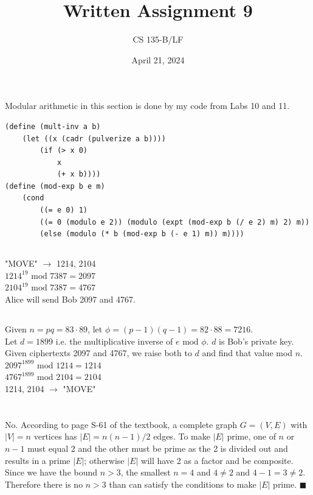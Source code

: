 \documentclass{article}
\title{Written Assignment 9}
\author{CS 135-B/LF}
\date{April 21, 2024}
\renewcommand{\mod}{\text{ mod }}
\begin{document}
\maketitle
\raggedright


\section{}
Modular arithmetic in this section is done by my code from Labs 10 and 11.\\
\begin{verbatim}
(define (mult-inv a b)
    (let ((x (cadr (pulverize a b))))
        (if (> x 0)
            x
            (+ x b))))
(define (mod-exp b e m)
    (cond
        ((= e 0) 1)
        ((= 0 (modulo e 2)) (modulo (expt (mod-exp b (/ e 2) m) 2) m))
        (else (modulo (* b (mod-exp b (- e 1) m)) m))))
\end{verbatim}
\subsection{}
"MOVE" $\rightarrow$ 1214, 2104\\
$1214^{19} \mod 7387 = 2097$\\
$2104^{19} \mod 7387 = 4767$\\
Alice will send Bob 2097 and 4767.

\subsection{}
Given $n = pq = 83\cdot89$, let $\phi = (p-1)(q-1) = 82\cdot88 = 7216$.\\
Let $d = 1899$ i.e. the multiplicative inverse of $e \mod \phi$. $d$ is Bob's private key. Given ciphertexts 2097 and 4767, we raise both to $d$ and find that value mod $n$.\\
$2097^{1899} \mod 1214 = 1214$\\
$4767^{1899} \mod 2104 = 2104$\\
1214, 2104 $\rightarrow$ "MOVE"


\section{}
No. According to page S-61 of the textbook, a complete graph $G = (V,E)$ with $|V| = n$ vertices has $|E| = n(n-1)/2$ edges. To make $|E|$ prime, one of $n$ or $n-1$ must equal 2 and the other must be prime as the 2 is divided out and results in a prime $|E|$; otherwise $|E|$ will have 2 as a factor and be composite. Since we have the bound $n>3$, the smallest $n = 4$ and $4 \neq 2$ and $4-1 = 3 \neq 2$. Therefore there is no $n>3$ than can satisfy the conditions to make $|E|$ prime. $\blacksquare$
\end{document}
